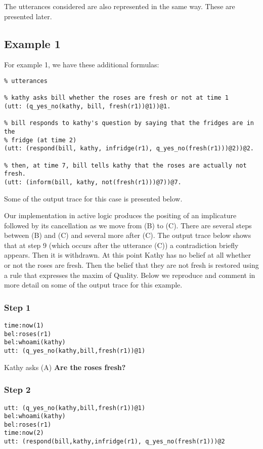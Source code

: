 \documentclass{article}
\begin{document}
The utterances considered are also represented in the same way. These
are presented later.




\subsection{Example 1}

For example 1, we have these additional formulas:

\begin{verbatim}
% utterances

% kathy asks bill whether the roses are fresh or not at time 1
(utt: (q_yes_no(kathy, bill, fresh(r1))@1))@1.

% bill responds to kathy's question by saying that the fridges are in the
% fridge (at time 2)
(utt: (respond(bill, kathy, infridge(r1), q_yes_no(fresh(r1)))@2))@2.

% then, at time 7, bill tells kathy that the roses are actually not fresh.
(utt: (inform(bill, kathy, not(fresh(r1)))@7))@7.

\end{verbatim}

Some of the output trace for this case is presented below.



Our implementation in active logic produces the positing of an implicature
followed by its cancellation as we move from (B) to (C). There are several steps
between (B) and (C) and several more after (C).  The output trace below shows
that at step 9 (which occurs after the utterance (C)) a contradiction briefly
appears. Then it is withdrawn. At this point Kathy has no belief at all whether
or not the roses are fresh. Then the belief that they are not fresh is restored
using a rule that expresses the maxim of Quality. Below we reproduce and comment
in more detail on some of the output trace for this example.

\subsubsection{Step 1}

\begin{verbatim}
time:now(1)
bel:roses(r1)
bel:whoami(kathy)
utt: (q_yes_no(kathy,bill,fresh(r1))@1)
\end{verbatim}

Kathy asks (A) {\bf Are the roses fresh?}

\subsubsection{Step 2}
\begin{verbatim}
utt: (q_yes_no(kathy,bill,fresh(r1))@1)
bel:whoami(kathy)
bel:roses(r1)
time:now(2)
utt: (respond(bill,kathy,infridge(r1), q_yes_no(fresh(r1)))@2
\end{verbatim}
\end{document}
